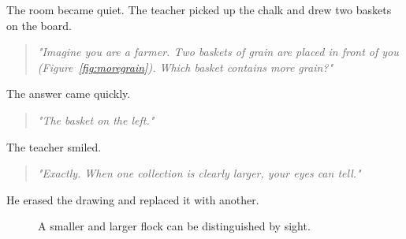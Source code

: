 \documentclass[11pt]{article}
\begin{document}
The room became quiet. The teacher picked up the chalk and drew two baskets on the board.
\begin{quote}
\emph{"Imagine you are a farmer. Two baskets of grain are placed in front of you (Figure~\ref{fig:moregrain}). Which basket contains more grain?"}
\end{quote}
The answer came quickly.
\begin{quote}
\emph{"The basket on the left."}
\end{quote}
The teacher smiled.
\begin{quote}
\emph{"Exactly. When one collection is clearly larger, your eyes can tell."}
\end{quote}
He erased the drawing and replaced it with another.

\begin{figure}[ht]
\centering


\caption{
A smaller and larger flock can be distinguished by sight.
}

\label{fig:sheepcomparison}

\end{figure}
\end{document}

